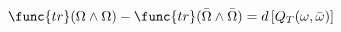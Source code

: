 \begin{equation}
\func{tr}(\Omega \wedge \Omega )-\func{tr}(\bar{\Omega }\wedge
\bar{\Omega })=d\,[Q_{T}(\omega ,\bar{\omega})] \label{eqn:Trans}
\end{equation}

